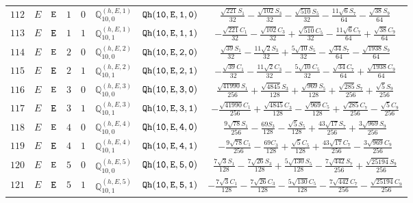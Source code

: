 \documentclass[fleqn,8pt]{jsarticle}
\begin{document}
\begin{table}[ht!]
\begin{center}
\begin{tabular}{cccccccc}
$ 112 $ & $ E $ & $ {\tt E} $ & $ 1 $ & $ 0 $ & $ \mathbb{Q}_{10,0}^{(h,E,1)} $ & $ {\tt Qh(10,E,1,0)} $ & $ \frac{\sqrt{221} S_{1}}{32} - \frac{\sqrt{102} S_{3}}{32} - \frac{\sqrt{510} S_{5}}{32} - \frac{11 \sqrt{6} S_{7}}{64} - \frac{\sqrt{38} S_{9}}{64} $ \\
$ 113 $ & $ E $ & $ {\tt E} $ & $ 1 $ & $ 1 $ & $ \mathbb{Q}_{10,1}^{(h,E,1)} $ & $ {\tt Qh(10,E,1,1)} $ & $ - \frac{\sqrt{221} C_{1}}{32} - \frac{\sqrt{102} C_{3}}{32} + \frac{\sqrt{510} C_{5}}{32} - \frac{11 \sqrt{6} C_{7}}{64} + \frac{\sqrt{38} C_{9}}{64} $ \\
$ 114 $ & $ E $ & $ {\tt E} $ & $ 2 $ & $ 0 $ & $ \mathbb{Q}_{10,0}^{(h,E,2)} $ & $ {\tt Qh(10,E,2,0)} $ & $ \frac{\sqrt{39} S_{1}}{32} - \frac{11 \sqrt{2} S_{3}}{32} + \frac{5 \sqrt{10} S_{5}}{32} - \frac{\sqrt{34} S_{7}}{64} - \frac{\sqrt{1938} S_{9}}{64} $ \\
$ 115 $ & $ E $ & $ {\tt E} $ & $ 2 $ & $ 1 $ & $ \mathbb{Q}_{10,1}^{(h,E,2)} $ & $ {\tt Qh(10,E,2,1)} $ & $ - \frac{\sqrt{39} C_{1}}{32} - \frac{11 \sqrt{2} C_{3}}{32} - \frac{5 \sqrt{10} C_{5}}{32} - \frac{\sqrt{34} C_{7}}{64} + \frac{\sqrt{1938} C_{9}}{64} $ \\
$ 116 $ & $ E $ & $ {\tt E} $ & $ 3 $ & $ 0 $ & $ \mathbb{Q}_{10,0}^{(h,E,3)} $ & $ {\tt Qh(10,E,3,0)} $ & $ \frac{\sqrt{41990} S_{1}}{256} + \frac{\sqrt{4845} S_{3}}{128} + \frac{\sqrt{969} S_{5}}{128} + \frac{\sqrt{285} S_{7}}{256} + \frac{\sqrt{5} S_{9}}{256} $ \\
$ 117 $ & $ E $ & $ {\tt E} $ & $ 3 $ & $ 1 $ & $ \mathbb{Q}_{10,1}^{(h,E,3)} $ & $ {\tt Qh(10,E,3,1)} $ & $ - \frac{\sqrt{41990} C_{1}}{256} + \frac{\sqrt{4845} C_{3}}{128} - \frac{\sqrt{969} C_{5}}{128} + \frac{\sqrt{285} C_{7}}{256} - \frac{\sqrt{5} C_{9}}{256} $ \\
$ 118 $ & $ E $ & $ {\tt E} $ & $ 4 $ & $ 0 $ & $ \mathbb{Q}_{10,0}^{(h,E,4)} $ & $ {\tt Qh(10,E,4,0)} $ & $ \frac{9 \sqrt{78} S_{1}}{256} - \frac{69 S_{3}}{128} - \frac{\sqrt{5} S_{5}}{128} + \frac{43 \sqrt{17} S_{7}}{256} + \frac{3 \sqrt{969} S_{9}}{256} $ \\
$ 119 $ & $ E $ & $ {\tt E} $ & $ 4 $ & $ 1 $ & $ \mathbb{Q}_{10,1}^{(h,E,4)} $ & $ {\tt Qh(10,E,4,1)} $ & $ - \frac{9 \sqrt{78} C_{1}}{256} - \frac{69 C_{3}}{128} + \frac{\sqrt{5} C_{5}}{128} + \frac{43 \sqrt{17} C_{7}}{256} - \frac{3 \sqrt{969} C_{9}}{256} $ \\
$ 120 $ & $ E $ & $ {\tt E} $ & $ 5 $ & $ 0 $ & $ \mathbb{Q}_{10,0}^{(h,E,5)} $ & $ {\tt Qh(10,E,5,0)} $ & $ \frac{7 \sqrt{3} S_{1}}{128} - \frac{7 \sqrt{26} S_{3}}{128} + \frac{5 \sqrt{130} S_{5}}{128} - \frac{7 \sqrt{442} S_{7}}{256} + \frac{\sqrt{25194} S_{9}}{256} $ \\
$ 121 $ & $ E $ & $ {\tt E} $ & $ 5 $ & $ 1 $ & $ \mathbb{Q}_{10,1}^{(h,E,5)} $ & $ {\tt Qh(10,E,5,1)} $ & $ - \frac{7 \sqrt{3} C_{1}}{128} - \frac{7 \sqrt{26} C_{3}}{128} - \frac{5 \sqrt{130} C_{5}}{128} - \frac{7 \sqrt{442} C_{7}}{256} - \frac{\sqrt{25194} C_{9}}{256} $ \\
 \hline \hline
\end{tabular}
\end{center}
\end{table}
\end{document}
